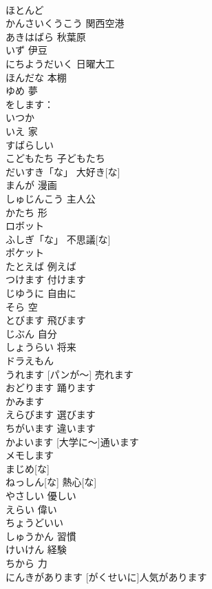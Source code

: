 \documentclass[8pt]{extreport}
\begin{document}
\begin{CJK}{UTF8}{min}
\\	ほとんど			
\\	かんさいくうこう	関西空港	
\\	あきはばら	秋葉原	
\\	いず	伊豆	
\\	にちようだいく	日曜大工	
\\	ほんだな	本棚	
\\	ゆめ	夢	
\\	をします：
\\	いつか			
\\	いえ	家	
\\	すばらしい			
\\	こどもたち	子どもたち	
\\	だいすき「な」	大好き[な]	
\\	まんが	漫画	
\\	しゅじんこう	主人公	
\\	かたち	形	
\\	ロボット			
\\	ふしぎ「な」	不思議[な]	
\\	ポケット			
\\	たとえば	例えば	
\\	つけます	付けます	
\\	じゆうに	自由に	
\\	そら	空	
\\	とびます	飛びます	
\\	じぶん	自分	
\\	しょうらい	将来	
\\	ドラえもん			
\\	[パンが～] うれます	[パンが～] 売れます	
\\	おどります	踊ります	
\\	かみます			
\\	えらびます	選びます	
\\	ちがいます	違います	
\\	[だいがくに～] かよいます	[大学に～]通います	
\\	メモします			
\\	まじめ[な]			
\\	ねっしん[な]	熱心[な]	
\\	やさしい	優しい	
\\	えらい	偉い	
\\	ちょうどいい			
\\	しゅうかん	習慣	
\\	けいけん	経験	
\\	ちから	力	
\\	[がくせいに]にんきがあります	[がくせいに]人気があります	

\end{CJK}
\end{document}
